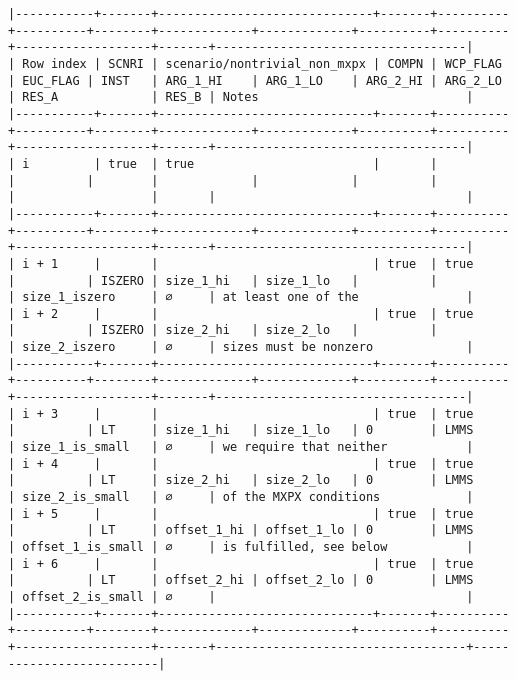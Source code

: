 \documentclass[varwidth=\maxdimen,margin=0.5cm,multi={verbatim}]{standalone}
\begin{document}
\begin{verbatim}
|-----------+-------+------------------------------+-------+----------+----------+--------+-------------+-------------+----------+----------+-------------------+-------+-----------------------------------|
| Row index | SCNRI | scenario/nontrivial_non_mxpx | COMPN | WCP_FLAG | EUC_FLAG | INST   | ARG_1_HI    | ARG_1_LO    | ARG_2_HI | ARG_2_LO | RES_A             | RES_B | Notes                             |
|-----------+-------+------------------------------+-------+----------+----------+--------+-------------+-------------+----------+----------+-------------------+-------+-----------------------------------|
| i         | true  | true                         |       |          |          |        |             |             |          |          |                   |       |                                   |
|-----------+-------+------------------------------+-------+----------+----------+--------+-------------+-------------+----------+----------+-------------------+-------+-----------------------------------|
| i + 1     |       |                              | true  | true     |          | ISZERO | size_1_hi   | size_1_lo   |          |          | size_1_iszero     | ∅     | at least one of the               |
| i + 2     |       |                              | true  | true     |          | ISZERO | size_2_hi   | size_2_lo   |          |          | size_2_iszero     | ∅     | sizes must be nonzero             |
|-----------+-------+------------------------------+-------+----------+----------+--------+-------------+-------------+----------+----------+-------------------+-------+-----------------------------------|
| i + 3     |       |                              | true  | true     |          | LT     | size_1_hi   | size_1_lo   | 0        | LMMS     | size_1_is_small   | ∅     | we require that neither           |
| i + 4     |       |                              | true  | true     |          | LT     | size_2_hi   | size_2_lo   | 0        | LMMS     | size_2_is_small   | ∅     | of the MXPX conditions            |
| i + 5     |       |                              | true  | true     |          | LT     | offset_1_hi | offset_1_lo | 0        | LMMS     | offset_1_is_small | ∅     | is fulfilled, see below           |
| i + 6     |       |                              | true  | true     |          | LT     | offset_2_hi | offset_2_lo | 0        | LMMS     | offset_2_is_small | ∅     |                                   |
|-----------+-------+------------------------------+-------+----------+----------+--------+-------------+-------------+----------+----------+-------------------+-------+-----------------------------------+--------------------------|

\end{verbatim}
\end{document}
